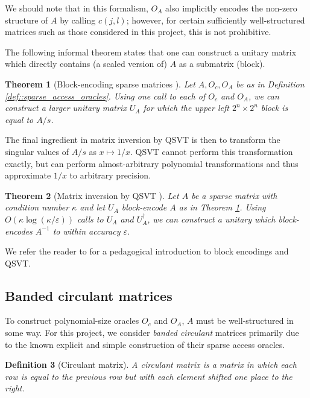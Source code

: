 \documentclass[10pt, twocolumn]{article}
\newtheorem{theorem}{Theorem}[section]
\newtheorem{definition}[theorem]{Definition}
\begin{document}
We should note that in this formalism, $O_A$ also implicitly encodes the non-zero structure of $A$ by calling $c(j, l)$; however, for certain sufficiently well-structured matrices such as those considered in this project, this is not prohibitive.

The following informal theorem states that one can construct a unitary matrix which directly contains (a scaled version of) $A$ as a submatrix (block).

\begin{theorem}[Block-encoding sparse matrices \cite{gilyen2019quantum, camps2203explicit}]
	\label{thm::block_encoding_sparse_matrices}
	Let $A, O_c, O_A$ be as in Definition \ref{def::sparse_access_oracles}. Using one call to each of $O_c$ and $O_A$, we can construct a larger unitary matrix $U_A$ for which the upper left $2^n \times 2^n$ block is equal to $A/s$.
\end{theorem}

The final ingredient in matrix inversion by QSVT is then to transform the singular values of $A/s$ as $x \mapsto 1/x$. QSVT cannot perform this transformation exactly, but can perform almost-arbitrary polynomial transformations \cite{sunderhauf2023generalized} and thus approximate $1/x$ to arbitrary precision.

\begin{theorem}[Matrix inversion by QSVT \cite{gilyen2019quantum}]
	\label{thm::matrix_inversion_by_qsvt}
	Let $A$ be a sparse matrix with condition number $\kappa$ and let $U_A$ block-encode $A$ as in Theorem \ref{thm::block_encoding_sparse_matrices}. Using $O(\kappa \log(\kappa / \varepsilon))$ calls to $U_A$ and $U_A^\dag$, we can construct a unitary which block-encodes $A^{-1}$ to within accuracy $\varepsilon$.
\end{theorem}

We refer the reader to \cite{martyn2021grand} for a pedagogical introduction to block encodings and QSVT.

\subsection{Banded circulant matrices}

To construct polynomial-size oracles $O_c$ and $O_A$, $A$ must be well-structured in some way. For this project, we consider \textit{banded circulant} matrices primarily due to the known explicit and simple construction of their sparse access oracles.

\begin{definition}[Circulant matrix]
	A circulant matrix is a matrix in which each row is equal to the previous row but with each element shifted one place to the right.
\end{definition}
\end{document}
